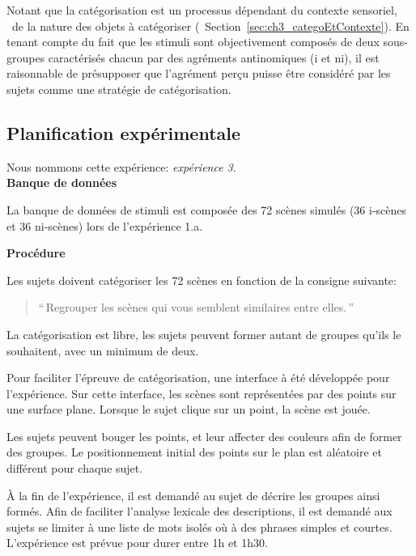 Notant que la catégorisation est un processus dépendant du contexte sensoriel, \ie~de la nature des objets à catégoriser (\cf~Section~\ref{sec:ch3_categoEtContexte}). En tenant compte du fait que les stimuli sont objectivement composés de deux sous-groupes caractérisés chacun par des agréments antinomiques (i et ni), il est raisonnable de présupposer que l'agrément perçu puisse être considéré par les sujets comme une stratégie de catégorisation.


\subsection{Planification expérimentale}

Nous nommons cette expérience: \emph{expérience 3}. \\

\textbf{Banque de données}

La banque de données de stimuli est composée des 72 scènes simulés (36 i-scènes et 36 ni-scènes) lors de l'expérience 1.a.

\textbf{Procédure}

Les sujets doivent catégoriser les 72 scènes en fonction de la consigne suivante:

\begin{quote}
``\,Regrouper les scènes qui vous semblent similaires entre elles.\,''
\end{quote}

La catégorisation est libre, les sujets peuvent former autant de groupes qu'ils le souhaitent, avec un minimum de deux. 

Pour faciliter l'épreuve de catégorisation, une interface à été développée pour l'expérience. Sur cette interface, les scènes sont représentées par des points sur une surface plane. Lorsque le sujet clique sur un point, la scène est jouée.

Les sujets peuvent bouger les points, et leur affecter des couleurs afin de former des groupes. Le positionnement initial des points sur le plan est aléatoire et différent pour chaque sujet.

À la fin de l'expérience, il est demandé au sujet de décrire les groupes ainsi formés. Afin de faciliter l'analyse lexicale des descriptions, il est demandé aux sujets se limiter à une liste de mots isolés où à des phrases simples et courtes. \\

L'expérience est prévue pour durer entre 1h et 1h30. \\

